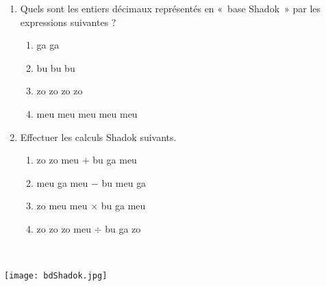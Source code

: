 \begin{td}
\noindent
\begin{minipage}[t]{8cm}
\begin{enumerate}
\item Quels sont les entiers décimaux représentés en «~base Shadok~» 
	par les expressions suivantes ?
	\begin{enumerate}
	\item {\sc ga} {\sc ga}
	\item {\sc bu} {\sc bu} {\sc bu}
	\item {\sc zo} {\sc zo} {\sc zo} {\sc zo}
	\item {\sc meu} {\sc meu} {\sc meu} {\sc meu} {\sc meu} 
	\end{enumerate}	
\item Effectuer les calculs Shadok suivants.
	\begin{enumerate}
	\item {\sc zo} {\sc zo} {\sc meu} $+$ {\sc bu} {\sc ga} {\sc meu}
	\item {\sc meu} {\sc ga} {\sc meu} $-$ {\sc bu} {\sc meu} {\sc ga}
	\item {\sc zo} {\sc meu} {\sc meu} $\times$ {\sc bu} {\sc ga} {\sc meu}
	\item {\sc zo} {\sc zo} {\sc zo} {\sc meu} $\div$ {\sc bu} {\sc ga} {\sc zo}
	\end{enumerate}
\end{enumerate}
\end{minipage}
\hfill
\begin{minipage}[t]{8cm}
\begin{fig}\label{fig:bdShadok}
\mbox{}\\
\centerline{\texttt{[image: bdShadok.jpg]}}
\end{fig}
\end{minipage}
\hfill
\begin{minipage}[t]{8cm}
\end{minipage}
\end{td}

